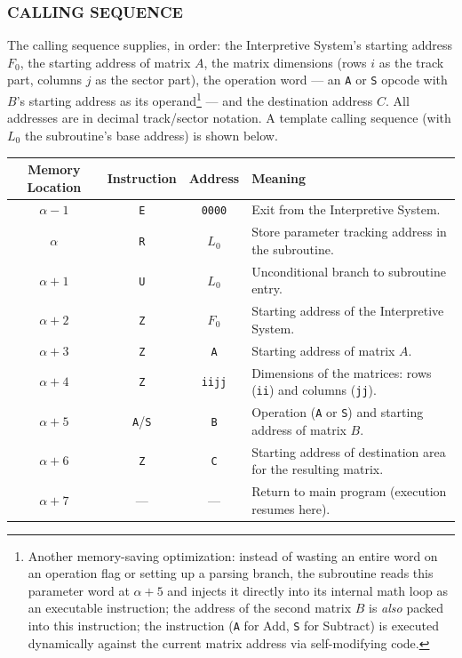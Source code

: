 \subsubsection*{CALLING SEQUENCE}
The calling sequence supplies, in order: the Interpretive System's starting address $F_0$, the starting address of matrix $A$, the matrix dimensions (rows $i$ as the track part, columns $j$ as the sector part), the operation word --- an \texttt{A} or \texttt{S} opcode with $B$'s starting address as its operand\footnote{Another memory-saving optimization: instead of wasting an entire word on an operation flag or setting up a parsing branch, the subroutine reads this parameter word at $\alpha+5$ and injects it directly into its internal math loop as an executable instruction; the address of the second matrix $B$ is \emph{also} packed into this instruction; the instruction (\texttt{A} for Add, \texttt{S} for Subtract) is executed dynamically against the current matrix address via self-modifying code.} --- and the destination address $C$. All addresses are in decimal track/sector notation. A template calling sequence (with \texttt{$L_0$} the subroutine's base address) is shown below.

\medskip
\begin{table}[h!]
\centering
\begin{tabularx}{\textwidth}{cccX}
\toprule
\textbf{Memory Location} & \textbf{Instruction} & \textbf{Address} & \textbf{Meaning} \\
\midrule
$\alpha - 1$      & \texttt{E}      & \texttt{0000}    & Exit from the Interpretive System. \\
$\alpha$          & \texttt{R}      & \texttt{$L_0$}   & Store parameter tracking address in the subroutine. \\
$\alpha + 1$      & \texttt{U}      & \texttt{$L_0$}   & Unconditional branch to subroutine entry. \\
$\alpha + 2$      & \texttt{Z}      & \texttt{$F_0$}   & Starting address of the Interpretive System. \\
$\alpha + 3$      & \texttt{Z}      & \texttt{A}       & Starting address of matrix $A$. \\
$\alpha + 4$      & \texttt{Z}      & \texttt{iijj}    & Dimensions of the matrices: rows (\texttt{ii}) and columns (\texttt{jj}). \\
$\alpha + 5$      & \texttt{A}/\texttt{S} & \texttt{B}  & Operation (\texttt{A} or \texttt{S}) and starting address of matrix $B$. \\
$\alpha + 6$      & \texttt{Z}      & \texttt{C}       & Starting address of destination area for the resulting matrix. \\
$\alpha + 7$      & ---              & ---              & Return to main program (execution resumes here). \\
\bottomrule
\end{tabularx}
\end{table}

